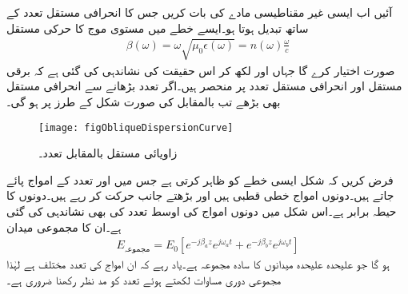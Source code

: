 آئیں اب ایسی غیر مقناطیسی مادے کی بات کریں جس کا انحرافی مستقل تعدد کے ساتھ تبدیل ہوتا ہو۔ایسے خطے میں مستوی موج کا حرکی مستقل
\begin{align}
\beta(\omega)=\omega\sqrt{\mu_0 \epsilon\left(\omega\right)}=n(\omega)\frac{\omega}{c}
\end{align}
صورت اختیار کرے گا جہاں  اور  لکھ کر اس حقیقت کی نشاندہی کی گئی ہے کہ برقی مستقل اور انحرافی مستقل تعدد پر منحصر ہیں۔اگر تعدد بڑھانے سے انحرافی مستقل  بھی بڑھے تب  بالمقابل  کی صورت شکل  کے طرز پر ہو گی۔
\begin{figure}
\centering
\texttt{[image: figObliqueDispersionCurve]}
\caption{زاویائی مستقل بالمقابل تعدد۔}
\label{شکل_ترچھی_حرکی_مستقل_بالمقابل_تعدد_خط}
\end{figure}

فرض کریں کہ شکل  ایسی خطے کو ظاہر کرتی ہے جس میں  اور  تعدد کے امواج پائے جاتے ہیں۔دونوں  امواج  خطی قطبی ہیں اور بڑھتے  جانب حرکت کر رہے ہیں۔دونوں کا حیطہ برابر ہے۔اس شکل میں دونوں امواج کی اوسط تعدد  کی بھی نشاندہی کی گئی ہے۔ان کا مجموعی میدان
\begin{align}\label{مساوات_ترچھی_انتشار_الف}
E_{\text{مجموعہ}}=E_0\left[e^{-j \beta_a z}e^{j \omega_a t}+e^{-j \beta_b z}e^{j \omega_b t}\right]
\end{align}
ہو گا جو علیحدہ علیحدہ میدانوں کا سادہ مجموعہ ہے۔یاد رہے کہ ان امواج کی تعدد مختلف ہے لہٰذا مجموعی دوری مساوات لکھتے ہوئے تعدد کو مد نظر رکھنا ضروری ہے۔


